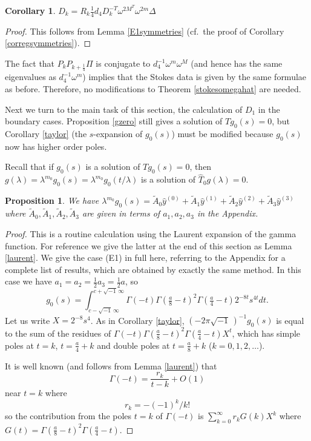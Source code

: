 \documentclass[a4paper,12pt,leqno]{amsart}
\numberwithin{equation}{section}
\theoremstyle{plain}
\newtheorem{proposition}[theorem]{Proposition}
\newtheorem{corollary}[theorem]{Corollary}
\theoremstyle{definition}
\newcommand{\la}{\lambda}
\newcommand{\De}{\Delta}
\newcommand{\om}{\omega}
\newcommand{\Ga}{\Gamma}
\newcommand{\no}{\noindent}
\renewcommand{\i}{ {\scriptscriptstyle\sqrt{-1}}\, }
\newcommand{\ii}{ {\scriptstyle\sqrt{-1}}\, }
\newcommand{\nn}{m}
\newcommand{\NN}{M}
\begin{document}
{\begin{corollary}
\no{Anti-symmetry: }  
$D_k=R_k \tfrac14 d_4 D_k^{-T} \om^{2\NN^T} \om^{2\nn} \De$
\end{corollary}

\begin{proof} 
This follows from Lemma \ref{E1symmetries} 
(cf.\  the proof of Corollary \ref{corregsymmetries}).
\end{proof}

The fact that $P_kP_{k+\frac14}\Pi$ is conjugate to $d_4^{-1} \om^\nn \om^\NN$
(and hence has the same eigenvalues as $d_4^{-1} \om^\nn$)
implies that the Stokes data is given by the same formulae as before.
Therefore, no modifications to Theorem \ref{stokesomegahat} are needed.

Next we turn to the main task of this section, the calculation of $D_1$ in the boundary cases.
Proposition \ref{gzero} still gives a solution
of $Tg_0(s)=0$, but Corollary \ref{taylor} (the $s$-expansion of $g_0(s)$) must be modified because $g_0(s)$ now has higher order poles.

Recall that if $g_0(s)$ is a solution of $Tg_0(s)=0$, then $g(\la)=\la^{\nn_0}g_0(s)=\la^{\nn_0}g_0(t/\la)$ is a solution of 
$\hat T_0 g(\la)=0$.  

\begin{proposition}\label{Rtaylor} We have
$\la^{\nn_0}g_0(s)=\tilde A_0 \hat y^{(0)}+\tilde A_1 \hat y^{(1)}+\tilde A_2 \hat y^{(2)}+\tilde A_3 \hat y^{(3)}$
where $\tilde A_0,\tilde A_1,\tilde A_2,\tilde A_3$ are given in terms of $a_1,a_2,a_3$ in the Appendix.
\end{proposition}

\begin{proof}  This is a routine calculation using the Laurent expansion of the gamma function.  For reference we give the latter at the end of this section as Lemma \ref{laurent}.
We give the case (E1) in full here, referring to the Appendix for a complete list of results, which are obtained by exactly the same method.  In this case we have
$a_1=a_2=\tfrac12 a_3=\tfrac12 a$, so 
\[
g_0(s)=
\int_{c-\i\infty}^{c+\i\infty}
\Ga( - t)\Ga(\tfrac {a}8 - t)^2\Ga(\tfrac {a}4 - t)
2^{-8t} s^{4t} dt.
\]
Let us write $X=2^{-8} s^{4}$.  As in Corollary \ref{taylor}, 
$(-2\pi\ii)^{-1}g_0(s)$ is equal to the sum of the residues of 
$\Ga( - t)\Ga(\tfrac {a}8 - t)^2\Ga(\tfrac {a}4 - t)X^t$, which has simple poles at
$t=k$, $t=\tfrac a4+k$ and double poles at $t=\tfrac a8+k$ ($k=0,1,2,\dots$).  

It is well known (and follows from Lemma \ref{laurent})
that 
\[
\Ga(-t)=\frac{r_k}{t-k} + O(1)
\]
near $t=k$ where 
\[
r_k=-{(-1)^k}/{k!}
\]
so the contribution from the poles $t=k$ of $\Ga( - t)$ 
is
$
\sum_{k=0}^\infty r_k G(k) X^k
$
where 
$G(t)=\Ga(\tfrac {a}8 - t)^2\Ga(\tfrac {a}4 - t)$.


\end{proof}}
\end{document}
